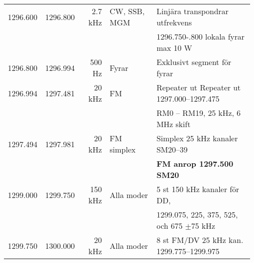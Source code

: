 \documentclass[10pt,swedish,a4paper,twoside]{article}
\begin{document}
\begin{landscape}
\begin{tabular}{rrrll}
	         1296.600 & 1296.800 &     2.7 kHz & CW, SSB, MGM    & Linjära transpondrar utfrekvens               \\
	                  &          &             &                 & 1296.750-.800 lokala fyrar max 10 W           \\ \hline
	         1296.800 & 1296.994 &      500 Hz & Fyrar           & Exklusivt segment för fyrar                   \\ \hline
	         1296.994 & 1297.481 &      20 kHz & FM              & Repeater ut Repeater ut 1297.000--1297.475    \\
	                  &          &             &                 & RM0 – RM19, 25 kHz, 6 MHz skift               \\ \hline
	         1297.494 & 1297.981 &      20 kHz & FM simplex      & Simplex 25 kHz kanaler SM20--39               \\
	                  &          &             &                 & \textbf{FM anrop 1297.500 SM20}               \\ \hline
	         1299.000 & 1299.750 &     150 kHz & Alla moder      & 5 st 150 kHz kanaler för DD,                  \\
	                  &          &             &                 & 1299.075, 225, 375, 525, och 675 $\pm$75 kHz  \\ \hline
	         1299.750 & 1300.000 &      20 kHz & Alla moder      & 8 st FM/DV 25 kHz kan. 1299.775--1299.975
\end{tabular}
\end{landscape}
\end{document}
